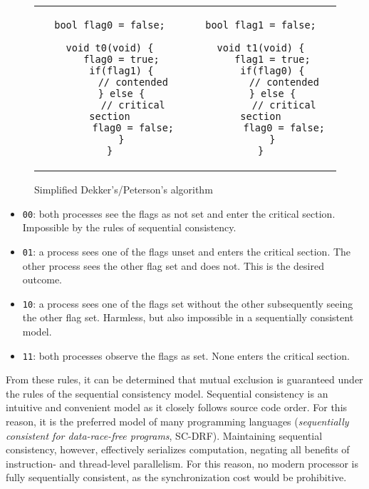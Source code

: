 
\begin{figure}
    \centering
    \begin{tabular}{cc}
        \begin{lstlisting}[style=c]
bool flag0 = false;

void t0(void) {
    flag0 = true;
    if(flag1) {
        // contended
    } else {
        // critical section
        flag0 = false;
    }
}
        \end{lstlisting}
        &
        \begin{lstlisting}[style=c]
bool flag1 = false;

void t1(void) {
    flag1 = true;
    if(flag0) {
        // contended
    } else {
        // critical section
        flag0 = false;
    }
}
        \end{lstlisting}
    \end{tabular}
    \caption{Simplified Dekker's/Peterson's algorithm}
    \label{fig:conc:dekker_peterson}
\end{figure}

\begin{itemize}
    \item
        \texttt{00}: both processes see the flags as not set and enter the
        critical section.  Impossible by the rules of sequential consistency.
    \item
        \texttt{01}: a process sees one of the flags unset and enters the
        critical section.  The other process sees the other flag set and does
        not.  This is the desired outcome.
    \item
        \texttt{10}: a process sees one of the flags set without the other
        subsequently seeing the other flag set.  Harmless, but also impossible
        in a sequentially consistent model.
    \item
        \texttt{11}: both processes observe the flags as set.  None enters the
        critical section.
\end{itemize}

From these rules, it can be determined that mutual exclusion is guaranteed under
the rules of the sequential consistency model.  Sequential consistency is an
intuitive and convenient model as it closely follows source code order.  For
this reason, it is the preferred model of many programming languages
(\textit{sequentially consistent for data-race-free programs}, SC-DRF).
Maintaining sequential consistency, however, effectively serializes computation,
negating all benefits of instruction- and thread-level parallelism.  For this
reason, no modern processor is fully sequentially consistent, as the
synchronization cost would be prohibitive.

